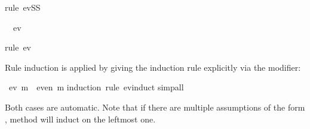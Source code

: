 \begin{isabellebody}
\begin{isamarkuptxt}
\begin{isabelle}
\end{isabelle}%
\end{isamarkuptxt}%
\isamarkuptrue%
\isamarkupfalse%
{}rule\ evSS{}%
\begin{isamarkuptxt}%
\begin{isabelle}%
\ {}{}\ ev\ {}%
\end{isabelle}%
\end{isamarkuptxt}%
\isamarkuptrue%
\isamarkupfalse%
{}rule\ ev{}{}\isanewline
{}\isamarkupfalse%
%
\endisatagproof
{\isafoldproof}%
%
\isadelimproof
%
\endisadelimproof
%
\begin{isamarkuptext}%
\indent
Rule induction is applied by giving the induction rule explicitly via the
 modifier:%
\end{isamarkuptext}%
\isamarkuptrue%
\isamarkupfalse%
\ {}ev\ m\ {}\ even\ m{}\isanewline
%
\isadelimproof
%
\endisadelimproof
%
\isatagproof
{}\isamarkupfalse%
{}induction\ rule{}\ ev{}induct{}\isanewline
{}\isamarkupfalse%
{}simp{}all{}%
\endisatagproof
{\isafoldproof}%
%
\isadelimproof
%
\endisadelimproof
%
\begin{isamarkuptext}%
Both cases are automatic. Note that if there are multiple assumptions
of the form , method  will induct on the leftmost
one.


\end{isamarkuptext}
\end{isabellebody}
